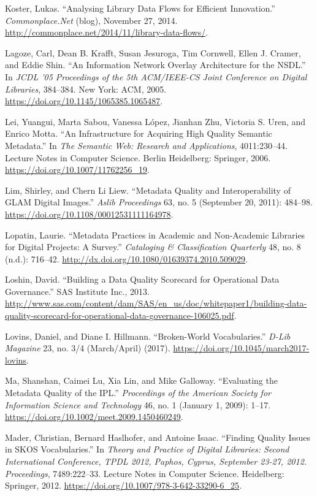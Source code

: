 Koster, Lukas. “Analysing Library Data Flows for Efficient Innovation.” \emph{Commonplace.Net} (blog), November 27, 2014. \url{http://commonplace.net/2014/11/library-data-flows/}.

Lagoze, Carl, Dean B. Krafft, Susan Jesuroga, Tim Cornwell, Ellen J. Cramer, and Eddie Shin. “An Information Network Overlay Architecture for the NSDL.” In \emph{JCDL ’05 Proceedings of the 5th ACM/IEEE-CS Joint Conference on Digital Libraries}, 384–384. New York: ACM, 2005. \url{https://doi.org/10.1145/1065385.1065487}.

Lei, Yuangui, Marta Sabou, Vanessa López, Jianhan Zhu, Victoria S. Uren, and Enrico Motta. “An Infrastructure for Acquiring High Quality Semantic Metadata.” In \emph{The Semantic Web: Research and Applications}, 4011:230–44. Lecture Notes in Computer Science. Berlin Heidelberg: Springer, 2006. \url{https://doi.org/10.1007/11762256_19}.

Lim, Shirley, and Chern Li Liew. “Metadata Quality and Interoperability of GLAM Digital Images.” \emph{Aslib Proceedings} 63, no. 5 (September 20, 2011): 484–98. \url{https://doi.org/10.1108/00012531111164978}.

Lopatin, Laurie. “Metadata Practices in Academic and Non-Academic Libraries for Digital Projects: A Survey.” \emph{Cataloging \& Classification Quarterly} 48, no. 8 (n.d.): 716–42. \url{http://dx.doi.org/10.1080/01639374.2010.509029}.

Loshin, David. “Building a Data Quality Scorecard for Operational Data Governance.” SAS Institute Inc., 2013. \url{http://www.sas.com/content/dam/SAS/en_us/doc/whitepaper1/building-data-quality-scorecard-for-operational-data-governance-106025.pdf}.

Lovins, Daniel, and Diane I. Hillmann. “Broken-World Vocabularies.” \emph{D-Lib Magazine} 23, no. 3/4 (March/April) (2017). \url{https://doi.org/10.1045/march2017-lovins}.

Ma, Shanshan, Caimei Lu, Xia Lin, and Mike Galloway. “Evaluating the Metadata Quality of the IPL.” \emph{Proceedings of the American Society for Information Science and Technology} 46, no. 1 (January 1, 2009): 1–17. \url{https://doi.org/10.1002/meet.2009.1450460249}.

Mader, Christian, Bernard Haslhofer, and Antoine Isaac. “Finding Quality Issues in SKOS Vocabularies.” In \emph{Theory and Practice of Digital Libraries: Second International Conference, TPDL 2012, Paphos, Cyprus, September 23-27, 2012. Proceedings}, 7489:222–33. Lecture Notes in Computer Science. Heidelberg: Springer, 2012. \url{https://doi.org/10.1007/978-3-642-33290-6_25}.

